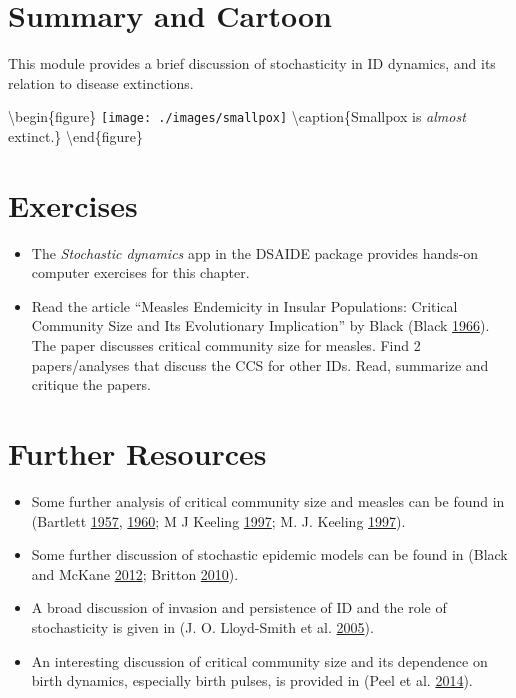 \documentclass[
]{book}
\providecommand{\tightlist}{%
  \setlength{\itemsep}{0pt}\setlength{\parskip}{0pt}}
\begin{document}
\hypertarget{summary-and-cartoon-12}{%
\section{Summary and Cartoon}\label{summary-and-cartoon-12}}

This module provides a brief discussion of stochasticity in ID dynamics, and its relation to disease extinctions.

\textbackslash begin\{figure\}
\texttt{[image: ./images/smallpox]} \textbackslash caption\{Smallpox is \emph{almost} extinct.\}\label{fig:smallpox}
\textbackslash end\{figure\}

\hypertarget{exercises-12}{%
\section{Exercises}\label{exercises-12}}

\begin{itemize}
\tightlist
\item
  The \emph{Stochastic dynamics} app in the DSAIDE package provides hands-on computer exercises for this chapter.
\item
  Read the article ``Measles Endemicity in Insular Populations: Critical Community Size and Its Evolutionary Implication'' by Black (Black \protect\hyperlink{ref-black66}{1966}). The paper discusses critical community size for measles. Find 2 papers/analyses that discuss the CCS for other IDs. Read, summarize and critique the papers.
\end{itemize}

\hypertarget{further-resources-12}{%
\section{Further Resources}\label{further-resources-12}}

\begin{itemize}
\tightlist
\item
  Some further analysis of critical community size and measles can be found in (Bartlett \protect\hyperlink{ref-bartlett57}{1957}, \protect\hyperlink{ref-bartlett60}{1960}; M J Keeling \protect\hyperlink{ref-keeling97}{1997}; M. J. Keeling \protect\hyperlink{ref-keeling97a}{1997}).
\item
  Some further discussion of stochastic epidemic models can be found in (Black and McKane \protect\hyperlink{ref-black12}{2012}; Britton \protect\hyperlink{ref-britton10a}{2010}).
\item
  A broad discussion of invasion and persistence of ID and the role of stochasticity is given in (J. O. Lloyd-Smith et al. \protect\hyperlink{ref-lloyd-smith05b}{2005}).
\item
  An interesting discussion of critical community size and its dependence on birth dynamics, especially birth pulses, is provided in (Peel et al. \protect\hyperlink{ref-peel14}{2014}).
\end{itemize}
\end{document}
